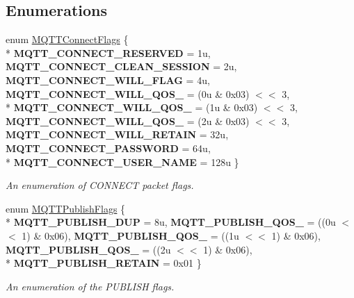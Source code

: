 \subsection*{Enumerations}
\begin{DoxyCompactItemize}
\item 
enum \hyperlink{group__packers_gad6fa84a96a940fe4eae6ffca1a6d945f}{M\+Q\+T\+T\+Connect\+Flags} \{ \\*
{\bfseries M\+Q\+T\+T\+\_\+\+C\+O\+N\+N\+E\+C\+T\+\_\+\+R\+E\+S\+E\+R\+V\+ED} = 1u, 
{\bfseries M\+Q\+T\+T\+\_\+\+C\+O\+N\+N\+E\+C\+T\+\_\+\+C\+L\+E\+A\+N\+\_\+\+S\+E\+S\+S\+I\+ON} = 2u, 
{\bfseries M\+Q\+T\+T\+\_\+\+C\+O\+N\+N\+E\+C\+T\+\_\+\+W\+I\+L\+L\+\_\+\+F\+L\+AG} = 4u, 
{\bfseries M\+Q\+T\+T\+\_\+\+C\+O\+N\+N\+E\+C\+T\+\_\+\+W\+I\+L\+L\+\_\+\+Q\+O\+S\+\_} = (0u \& 0x03) $<$$<$ 3, 
\\*
{\bfseries M\+Q\+T\+T\+\_\+\+C\+O\+N\+N\+E\+C\+T\+\_\+\+W\+I\+L\+L\+\_\+\+Q\+O\+S\+\_} = (1u \& 0x03) $<$$<$ 3, 
{\bfseries M\+Q\+T\+T\+\_\+\+C\+O\+N\+N\+E\+C\+T\+\_\+\+W\+I\+L\+L\+\_\+\+Q\+O\+S\+\_} = (2u \& 0x03) $<$$<$ 3, 
{\bfseries M\+Q\+T\+T\+\_\+\+C\+O\+N\+N\+E\+C\+T\+\_\+\+W\+I\+L\+L\+\_\+\+R\+E\+T\+A\+IN} = 32u, 
{\bfseries M\+Q\+T\+T\+\_\+\+C\+O\+N\+N\+E\+C\+T\+\_\+\+P\+A\+S\+S\+W\+O\+RD} = 64u, 
\\*
{\bfseries M\+Q\+T\+T\+\_\+\+C\+O\+N\+N\+E\+C\+T\+\_\+\+U\+S\+E\+R\+\_\+\+N\+A\+ME} = 128u
 \}\begin{DoxyCompactList}\small\item\em An enumeration of C\+O\+N\+N\+E\+CT packet flags. \end{DoxyCompactList}
\item 
enum \hyperlink{group__packers_gad38a41e1c497f9bcd2477c005f280b23}{M\+Q\+T\+T\+Publish\+Flags} \{ \\*
{\bfseries M\+Q\+T\+T\+\_\+\+P\+U\+B\+L\+I\+S\+H\+\_\+\+D\+UP} = 8u, 
{\bfseries M\+Q\+T\+T\+\_\+\+P\+U\+B\+L\+I\+S\+H\+\_\+\+Q\+O\+S\+\_} = ((0u $<$$<$ 1) \& 0x06), 
{\bfseries M\+Q\+T\+T\+\_\+\+P\+U\+B\+L\+I\+S\+H\+\_\+\+Q\+O\+S\+\_} = ((1u $<$$<$ 1) \& 0x06), 
{\bfseries M\+Q\+T\+T\+\_\+\+P\+U\+B\+L\+I\+S\+H\+\_\+\+Q\+O\+S\+\_} = ((2u $<$$<$ 1) \& 0x06), 
\\*
{\bfseries M\+Q\+T\+T\+\_\+\+P\+U\+B\+L\+I\+S\+H\+\_\+\+R\+E\+T\+A\+IN} = 0x01
 \}\begin{DoxyCompactList}\small\item\em An enumeration of the P\+U\+B\+L\+I\+SH flags. \end{DoxyCompactList}
\end{DoxyCompactItemize}
